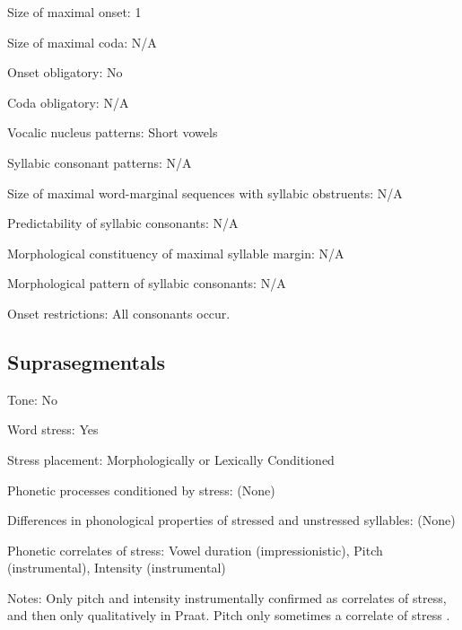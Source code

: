 {\begin{appendixdesc}
\item[Size of maximal onset:] 1

\item[Size of maximal coda:] N/A

\item[Onset obligatory:] No

\item[Coda obligatory:] N/A

\item[Vocalic nucleus patterns:] Short vowels

\item[Syllabic consonant patterns:] N/A

\item[Size of maximal word-marginal sequences with syllabic obstruents:] N/A

\item[Predictability of syllabic consonants:] N/A

\item[Morphological constituency of maximal syllable margin:] N/A

\item[Morphological pattern of syllabic consonants:] N/A

\item[Onset restrictions:] All consonants occur.
\end{appendixdesc}
\subsection*{Suprasegmentals}
\begin{appendixdesc}
\item[Tone:] No

\item[Word stress:] Yes

\item[Stress placement:] Morphologically or Lexically Conditioned

\item[Phonetic processes conditioned by stress:] (None)

\item[Differences in phonological properties of stressed and unstressed syllables:] (None)

\item[Phonetic correlates of stress:] Vowel duration (impressionistic), Pitch (instrumental), Intensity (instrumental)

\item[Notes:] Only pitch and intensity instrumentally confirmed as correlates of stress, and then only qualitatively in Praat. Pitch only sometimes a correlate of stress \citet[24]{Wegener2008}.
\end{appendixdesc}
}
